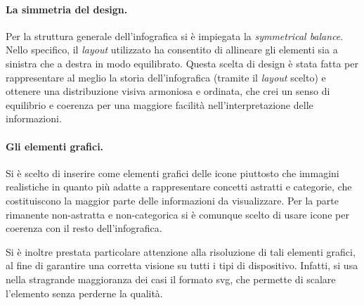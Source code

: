 \paragraph{La simmetria del design.} Per la struttura generale dell'infografica si è impiegata la \emph{symmetrical balance}.
Nello specifico, il \emph{layout} utilizzato ha consentito di allineare gli elementi sia a sinistra che a destra in modo equilibrato. 
Questa scelta di design è stata fatta per rappresentare al meglio la storia dell'infografica (tramite il \emph{layout} scelto) e ottenere una distribuzione visiva armoniosa e ordinata,
che crei un senso di equilibrio e coerenza per una maggiore facilità nell'interpretazione delle informazioni.

\paragraph{Gli elementi grafici.} Si è scelto di inserire come elementi grafici delle icone piuttosto che immagini realistiche in quanto più adatte a rappresentare concetti astratti e categorie, che costituiscono la maggior parte 
delle informazioni da visualizzare. Per la parte rimanente non-astratta e non-categorica si è comunque scelto di usare icone per coerenza con il resto dell'infografica.

Si è inoltre prestata particolare attenzione alla risoluzione di tali elementi grafici, al fine di garantire una corretta visione su tutti i tipi di dispositivo.
Infatti, si usa nella stragrande maggioranza dei casi il formato \gls{svg}, che permette di scalare l'elemento senza perderne la qualità.

